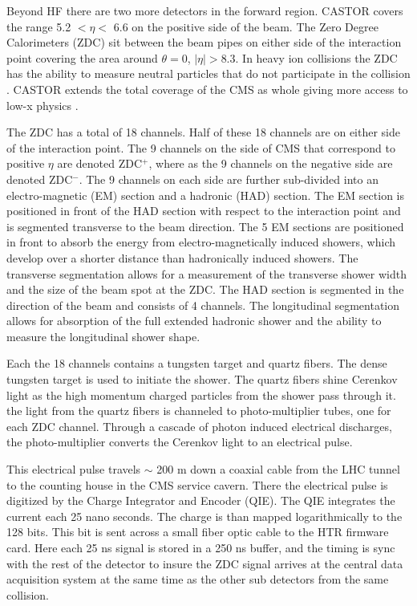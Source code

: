 Beyond HF there are two more detectors in the forward region.
CASTOR covers the range 5.2 $< \eta <$ 6.6 on the positive side of the beam. 
The Zero Degree Calorimeters (ZDC) sit between the beam pipes on either side of
	the interaction point covering the area around $\theta = 0$, $|\eta| > 
	8.3$.
In heavy ion collisions the ZDC has the ability to measure neutral particles 
	that do not participate in the collision \cite{tCmsE}.
CASTOR extends the total coverage of the CMS as whole giving more access to 
	low-x physics \cite{tCmsE}.

The ZDC has a total of 18 channels.
Half of these 18 channels are on either side of the interaction point.
The 9 channels on the side of CMS that correspond to positive $\eta$
  are denoted ZDC$^{+}$, where as the 9 channels on the negative side are
  denoted ZDC$^{-}$.
The 9 channels on each side are further sub-divided into an electro-magnetic  
  (EM) section and a hadronic (HAD) section.
The EM section is positioned in front of the HAD section with respect to the 
  interaction point and is segmented transverse to the beam direction.
The 5 EM sections are positioned in front to absorb the energy from 
  electro-magnetically induced showers, which develop over a shorter distance 
  than hadronically induced showers.
The transverse segmentation allows for a measurement of the transverse shower
  width and the size of the beam spot at the ZDC.
The HAD section is segmented in the direction of the beam and consists of 4
  channels.
The longitudinal segmentation allows for absorption of the full extended 
  hadronic shower and the ability to measure the longitudinal shower shape.

Each the 18 channels contains a tungsten target and quartz fibers.
The dense tungsten target is used to initiate the shower.
The quartz fibers shine Cerenkov light as the high momentum charged particles
  from the shower pass through it. 
the light from the quartz fibers is channeled to photo-multiplier tubes, one 
  for each ZDC channel. 
Through a cascade of photon induced electrical discharges, the photo-multiplier
  converts the Cerenkov light to an electrical pulse. 

This electrical pulse travels $\sim$ 200 m down a coaxial cable from the LHC
  tunnel to the counting house in the CMS service cavern. 
There the electrical pulse is digitized by the Charge Integrator and Encoder 
  (QIE).
The QIE integrates the current each 25 nano seconds.
The charge is than mapped logarithmically to the 128 bits. 
This bit is sent across a small fiber optic cable to the HTR firmware card.
Here each 25 ns signal is stored in a 250 ns buffer, and the timing is sync
  with the rest of the detector to insure the ZDC signal arrives at the central
  data acquisition system at the same time as the other sub detectors from the 
  same collision. 

